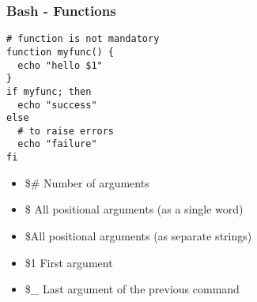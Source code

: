 \subsubsection{Bash - Functions}
\begin{frame}[fragile]{\subsubsecname}
  \begin{lstlisting}
# function is not mandatory
function myfunc() {
  echo "hello $1"
}
if myfunc; then
  echo "success"
else
  # to raise errors
  echo "failure"
fi
  \end{lstlisting}
  \begin{itemize}
    \item \$\# Number of arguments
    \item \$\* All positional arguments (as a single word)
    \item \$\@ All positional arguments (as separate strings)
    \item \$1 First argument
    \item \$\_ Last argument of the previous command
  \end{itemize}
\end{frame}

